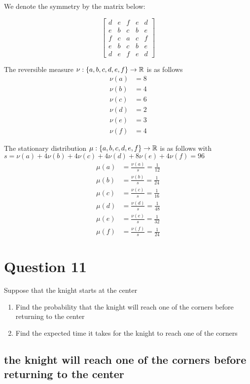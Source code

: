 \documentclass{article}
\begin{document}
We denote the symmetry by the matrix below:

$$
    \begin{bmatrix}
        d & e & f & e & d \\
        e & b & c & b & e \\
        f & c & a & c & f \\
        e & b & c & b & e \\
        d & e & f & e & d
    \end{bmatrix}
$$

The reversible measure $\nu: \{a,b,c,d,e,f\} \to \mathbb{R}$ is as follows
\begin{align*}
    \nu(a) &= 8 \\
    \nu(b) &= 4 \\
    \nu(c) &= 6 \\
    \nu(d) &= 2 \\
    \nu(e) &= 3 \\
    \nu(f) &= 4
\end{align*}

The stationary distribution $\mu: \{a,b,c,d,e,f\} \to \mathbb{R}$ is as follows with $s = \nu(a) + 4 \nu(b) + 4 \nu(c) + 4 \nu(d) + 8 \nu(e) + 4 \nu(f) = 96$
\begin{align*}
    \mu(a) &= \frac{\nu(a)}{s} = \frac{1}{12} \\
    \mu(b) &= \frac{\nu(b)}{s} = \frac{1}{24} \\
    \mu(c) &= \frac{\nu(c)}{s} = \frac{1}{16} \\
    \mu(d) &= \frac{\nu(d)}{s} = \frac{1}{48} \\
    \mu(e) &= \frac{\nu(e)}{s} = \frac{1}{32} \\
    \mu(f) &= \frac{\nu(f)}{s} = \frac{1}{24}
\end{align*}

\section{Question 11}
Suppose that the knight starts at the center
\begin{enumerate}
    \item Find the probability that the knight will reach one of the corners before returning to the center
    \item Find the expected time it takes for the knight to reach one of the corners
\end{enumerate}

\subsection{the knight will reach one of the corners before returning to the center}
\end{document}
